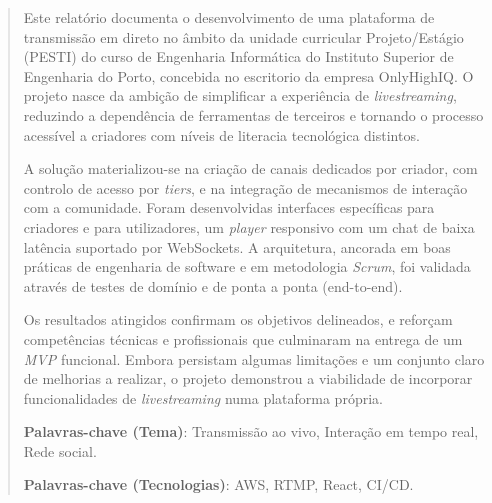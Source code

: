 \begin{abstract}

Este relatório documenta o desenvolvimento de uma plataforma de transmissão em direto no âmbito da unidade curricular Projeto/Estágio (PESTI) do curso de Engenharia Informática do Instituto Superior de Engenharia do Porto, concebida no escritorio da empresa OnlyHighIQ. O projeto nasce da ambição de simplificar a experiência de \textit{livestreaming}, reduzindo a dependência de ferramentas de terceiros e tornando o processo acessível a criadores com níveis de literacia tecnológica distintos.

A solução materializou-se na criação de canais dedicados por criador, com controlo de acesso por \textit{tiers}, e na integração de mecanismos de interação com a comunidade. Foram desenvolvidas interfaces específicas para criadores e para utilizadores, um \textit{player} responsivo com um chat de baixa latência suportado por WebSockets. A arquitetura, ancorada em boas práticas de engenharia de software e em metodologia \textit{Scrum}, foi validada através de testes de domínio e de ponta a ponta (end-to-end).

Os resultados atingidos confirmam os objetivos delineados, e reforçam competências técnicas e profissionais que culminaram na entrega de um \textit{MVP} funcional. Embora persistam algumas limitações e um conjunto claro de melhorias a realizar, o projeto demonstrou a viabilidade de incorporar funcionalidades de \textit{livestreaming} numa plataforma própria.

\vspace{20mm} %

\textbf{Palavras-chave (Tema)}:	Transmissão ao vivo, Interação em tempo real, Rede social.

\textbf{Palavras-chave (Tecnologias)}: 	AWS, RTMP, React, CI/CD.

\end{abstract}

